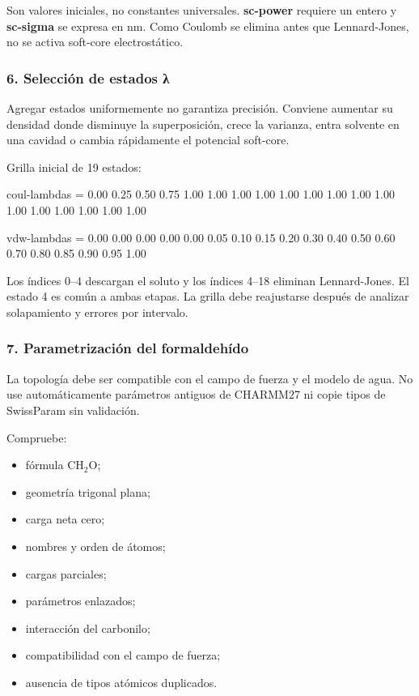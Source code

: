 \documentclass[
  spanish,
  11pt,
  a4paper]{article}
\newenvironment{Shaded}{\begin{snugshade}}{\end{snugshade}}
\newcommand{\DataTypeTok}[1]{\textcolor[rgb]{0.13,0.29,0.53}{#1}}
\newcommand{\OtherTok}[1]{\textcolor[rgb]{0.56,0.35,0.01}{#1}}
\newcommand{\StringTok}[1]{\textcolor[rgb]{0.31,0.60,0.02}{#1}}
\providecommand{\tightlist}{%
  \setlength{\itemsep}{0pt}\setlength{\parskip}{0pt}}
\begin{document}
Son valores iniciales, no constantes universales. \textbf{sc-power}
requiere un entero y \textbf{sc-sigma} se expresa en nm. Como Coulomb se
elimina antes que Lennard-Jones, no se activa soft-core electrostático.

\subsubsection{6. Selección de estados
λ}\label{selecciuxf3n-de-estados-ux3bb}

Agregar estados uniformemente no garantiza precisión. Conviene aumentar
su densidad donde disminuye la superposición, crece la varianza, entra
solvente en una cavidad o cambia rápidamente el potencial soft-core.

Grilla inicial de 19 estados:

\begin{Shaded}
\begin{Highlighting}[]
\DataTypeTok{coul{-}lambdas }\OtherTok{=}\StringTok{ 0.00 0.25 0.50 0.75 1.00 1.00 1.00 1.00 1.00 1.00 1.00 1.00 1.00 1.00 1.00 1.00 1.00 1.00 1.00}

\DataTypeTok{vdw{-}lambdas  }\OtherTok{=}\StringTok{ 0.00 0.00 0.00 0.00 0.00 0.05 0.10 0.15 0.20 0.30 0.40 0.50 0.60 0.70 0.80 0.85 0.90 0.95 1.00}
\end{Highlighting}
\end{Shaded}

Los índices 0--4 descargan el soluto y los índices 4--18 eliminan
Lennard-Jones. El estado 4 es común a ambas etapas. La grilla debe
reajustarse después de analizar solapamiento y errores por intervalo.

\subsubsection{7. Parametrización del
formaldehído}\label{parametrizaciuxf3n-del-formaldehuxeddo}

La topología debe ser compatible con el campo de fuerza y el modelo de
agua. No use automáticamente parámetros antiguos de CHARMM27 ni copie
tipos de SwissParam sin validación.

Compruebe:

\begin{itemize}
\tightlist
\item
  fórmula \(\mathrm{CH_2O}\);
\item
  geometría trigonal plana;
\item
  carga neta cero;
\item
  nombres y orden de átomos;
\item
  cargas parciales;
\item
  parámetros enlazados;
\item
  interacción del carbonilo;
\item
  compatibilidad con el campo de fuerza;
\item
  ausencia de tipos atómicos duplicados.
\end{itemize}
\end{document}
